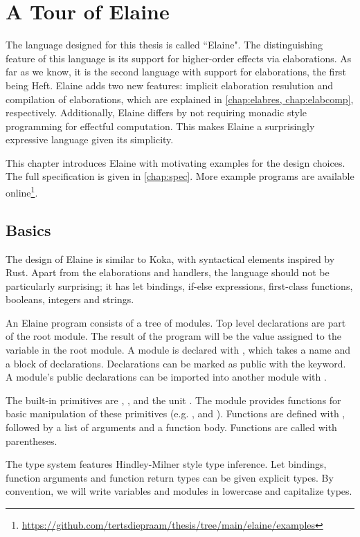 \chapter{A Tour of Elaine}\label{chap:basics}

The language designed for this thesis is called ``Elaine". The distinguishing feature of this language is its support for higher-order effects via elaborations. As far as we know, it is the second language with support for elaborations, the first being Heft. Elaine adds two new features: implicit elaboration resulution and compilation of elaborations, which are explained in \cref{chap:elabres, chap:elabcomp}, respectively. Additionally, Elaine differs by not requiring monadic style programming for effectful computation. This makes Elaine a surprisingly expressive language given its simplicity.

This chapter introduces Elaine with motivating examples for the design choices. The full specification is given in \cref{chap:spec}. More example programs are available online\footnote{\url{https://github.com/tertsdiepraam/thesis/tree/main/elaine/examples}}.

\section{Basics}

The design of Elaine is similar to Koka, with syntactical elements inspired by Rust. Apart from the elaborations and handlers, the language should not be particularly surprising; it has let bindings, if-else expressions, first-class functions, booleans, integers and strings.

An Elaine program consists of a tree of modules. Top level declarations are part of the root module. The result of the program will be the value assigned to the  variable in the root module. A module is declared with , which takes a name and a block of declarations. Declarations can be marked as public with the  keyword. A module's public declarations can be imported into another module with .

The built-in primitives are , ,  and the unit \el{()}. The  module provides functions for basic manipulation of these primitives (e.g. ,  and ). Functions are defined with , followed by a list of arguments and a function body. Functions are called with parentheses.

The type system features Hindley-Milner style type inference. Let bindings, function arguments and function return types can be given explicit types. By convention, we will write variables and modules in lowercase and capitalize types.

